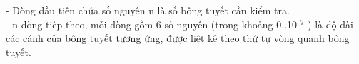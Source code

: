 - Dòng đầu tiên chứa số nguyên n là số bông tuyết cần kiểm tra.   
\\   - n dòng tiếp theo, mỗi dòng gồm 6 số nguyên (trong khoảng 0..10   $^    7   $   ) là độ dài các cánh của bông tuyết tương ứng, được liệt kê theo thứ tự vòng quanh bông tuyết.